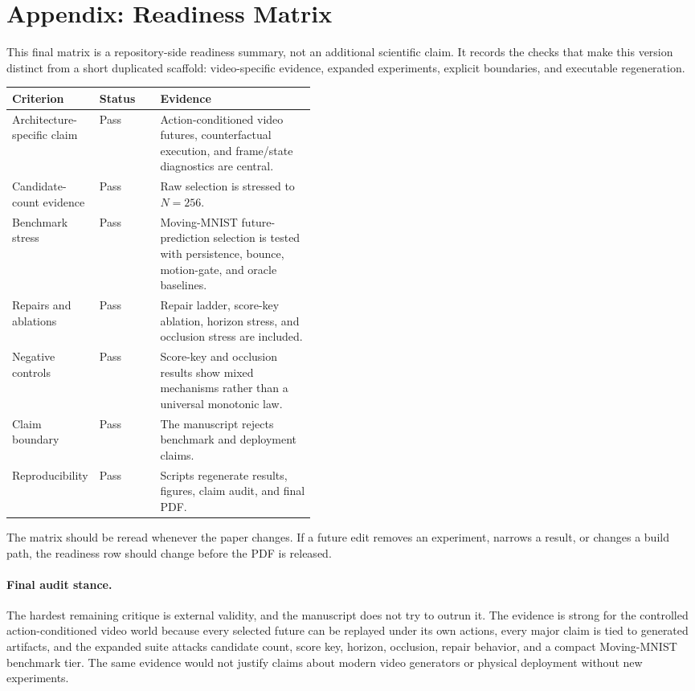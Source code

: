 \documentclass{article}
\begin{document}
\section{Appendix: Readiness Matrix}

This final matrix is a repository-side readiness summary, not an additional scientific claim. It records the checks that make this version distinct from a short duplicated scaffold: video-specific evidence, expanded experiments, explicit boundaries, and executable regeneration.

\begin{center}
  \small
  \begin{tabularx}{\linewidth}{@{}p{0.24\linewidth}p{0.20\linewidth}X@{}}
    \toprule
    Criterion & Status & Evidence \\
    \midrule
    Architecture-specific claim & Pass & Action-conditioned video futures, counterfactual execution, and frame/state diagnostics are central. \\
    Candidate-count evidence & Pass & Raw selection is stressed to \(N=256\). \\
    Benchmark stress & Pass & Moving-MNIST future-prediction selection is tested with persistence, bounce, motion-gate, and oracle baselines. \\
    Repairs and ablations & Pass & Repair ladder, score-key ablation, horizon stress, and occlusion stress are included. \\
    Negative controls & Pass & Score-key and occlusion results show mixed mechanisms rather than a universal monotonic law. \\
    Claim boundary & Pass & The manuscript rejects benchmark and deployment claims. \\
    Reproducibility & Pass & Scripts regenerate results, figures, claim audit, and final PDF. \\
    \bottomrule
  \end{tabularx}
\end{center}

The matrix should be reread whenever the paper changes. If a future edit removes an experiment, narrows a result, or changes a build path, the readiness row should change before the PDF is released.

\paragraph{Final audit stance.}
The hardest remaining critique is external validity, and the manuscript does not try to outrun it. The evidence is strong for the controlled action-conditioned video world because every selected future can be replayed under its own actions, every major claim is tied to generated artifacts, and the expanded suite attacks candidate count, score key, horizon, occlusion, repair behavior, and a compact Moving-MNIST benchmark tier. The same evidence would not justify claims about modern video generators or physical deployment without new experiments.
\end{document}
